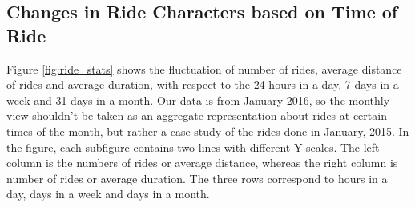 \documentclass{article}
\begin{document}
\subsection{Changes in Ride Characters based on Time of Ride}

Figure \ref{fig:ride_stats} shows the fluctuation of number of rides, average distance of rides and average duration, with respect to the 24 hours in a day, 7 days in a week and 31 days in a month. Our data is from January 2016, so the monthly view shouldn't be taken as an aggregate representation about rides at certain times of the month, but rather a case study of the rides done in January, 2015. In the figure, each subfigure contains two lines with different Y scales. The left column is the numbers of rides or average distance, whereas the right column is number of rides or average duration. The three rows correspond to hours in a day, days in a week and days in a month.
\end{document}
